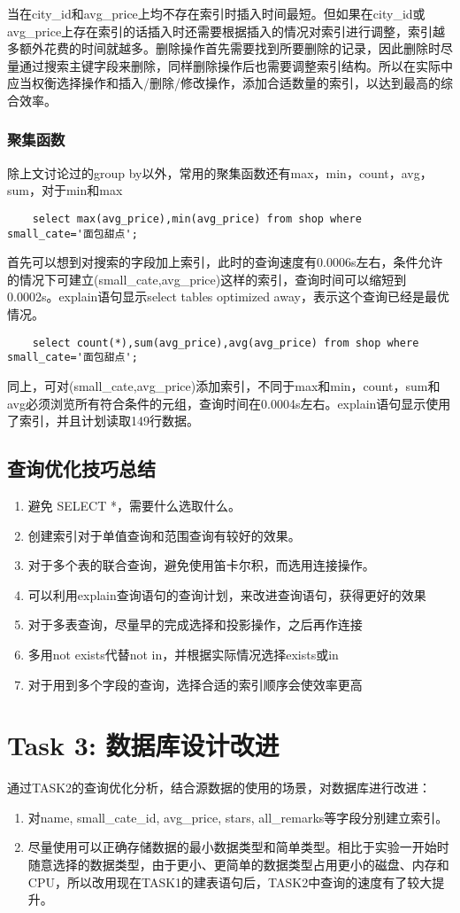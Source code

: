 \documentclass[a4paper, 11pt, nofonts, nocap, fancyhdr]{ctexart}
\begin{document}
当在city_id和avg_price上均不存在索引时插入时间最短。但如果在city_id或avg_price上存在索引的话插入时还需要根据插入的情况对索引进行调整，索引越多额外花费的时间就越多。删除操作首先需要找到所要删除的记录，因此删除时尽量通过搜索主键字段来删除，同样删除操作后也需要调整索引结构。所以在实际中应当权衡选择操作和插入/删除/修改操作，添加合适数量的索引，以达到最高的综合效率。

\subsubsection{聚集函数}
	
除上文讨论过的group by以外，常用的聚集函数还有max，min，count，avg，sum，对于min和max

	\begin{lstlisting}
	select max(avg_price),min(avg_price) from shop where small_cate='面包甜点';
	\end{lstlisting}

首先可以想到对搜索的字段加上索引，此时的查询速度有0.0006s左右，条件允许的情况下可建立(small_cate,avg_price)这样的索引，查询时间可以缩短到0.0002s。explain语句显示select tables optimized away，表示这个查询已经是最优情况。

	\begin{lstlisting}
	select count(*),sum(avg_price),avg(avg_price) from shop where small_cate='面包甜点';
	\end{lstlisting}

同上，可对(small_cate,avg_price)添加索引，不同于max和min，count，sum和avg必须浏览所有符合条件的元组，查询时间在0.0004s左右。explain语句显示使用了索引，并且计划读取149行数据。

\subsection{查询优化技巧总结}

\begin{enumerate}
	\item 避免 SELECT *，需要什么选取什么。
	\item 创建索引对于单值查询和范围查询有较好的效果。
	\item 对于多个表的联合查询，避免使用笛卡尔积，而选用连接操作。
	\item 可以利用explain查询语句的查询计划，来改进查询语句，获得更好的效果
	\item 对于多表查询，尽量早的完成选择和投影操作，之后再作连接
	\item 多用not exists代替not in，并根据实际情况选择exists或in
	\item 对于用到多个字段的查询，选择合适的索引顺序会使效率更高
\end{enumerate}

\section{Task 3: 数据库设计改进}

通过TASK2的查询优化分析，结合源数据的使用的场景，对数据库进行改进：

\begin{enumerate}
	\item 对name, small_cate_id, avg_price, stars, all_remarks等字段分别建立索引。
	\item 尽量使用可以正确存储数据的最小数据类型和简单类型。相比于实验一开始时随意选择的数据类型，由于更小、更简单的数据类型占用更小的磁盘、内存和CPU，所以改用现在TASK1的建表语句后，TASK2中查询的速度有了较大提升。
\end{enumerate}
\end{document}
